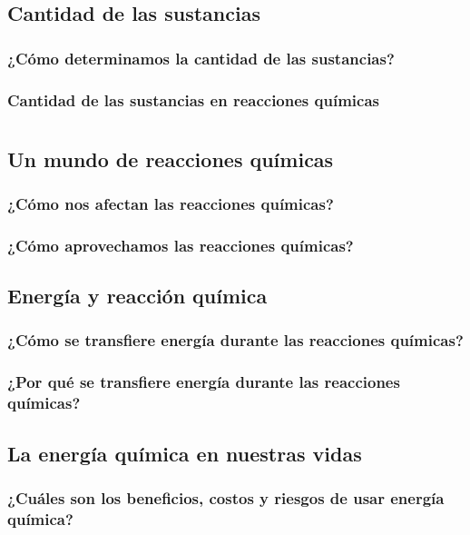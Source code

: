 \documentclass[11pt]{book}
\begin{document}
\section{Cantidad de las sustancias}
\subsection{¿Cómo determinamos la cantidad de las sustancias?}
\subsection{Cantidad de las sustancias en reacciones químicas}

\newpage
\chapter{}

\newpage \thispagestyle{plain}
\section{Un mundo de reacciones químicas}
\subsection{¿Cómo nos afectan las reacciones químicas?}
\subsection{¿Cómo aprovechamos las reacciones químicas?}

\newpage \thispagestyle{plain}
\section{Energía y reacción química}
\subsection{¿Cómo se transfiere energía durante las reacciones químicas?}
\subsection{¿Por qué se transfiere energía durante las reacciones químicas?}

\newpage \thispagestyle{plain}
\section{La energía química en nuestras vidas}
\subsection{¿Cuáles son los beneficios, costos y riesgos de usar energía química?}
\end{document}
